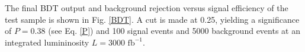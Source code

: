 \documentclass[10pt,a4paper]{article}
\begin{document}
The final BDT output and background rejection versus signal efficiency of the test sample is shown in Fig. \ref{BDT}. A cut is made at 0.25, yielding a significance of $P=0.38$ (see Eq. \eqref{P}) and 100 signal events and 5000 background events at an integrated lumininosity $L = 3000 \text{ fb}^{-1}$.


\end{document}
